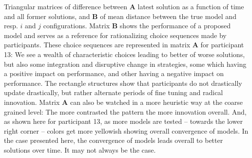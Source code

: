 \label{fig:matrices}
Triangular matrices of difference between {\bf A} latest solution as a function of time and all former solutions, and {\bf B} of mean distance between the true model and resp. $i$ and $j$ configurations. Matrix {\bf B} shows the performance of a proposed model and serves as a reference for rationalizing choice sequences made by participants. These choice sequences are represented in matrix {\bf A} for participant 13: We see a wealth of characteristic choices leading to better of worse solutions, but also some integration and disruptive change in strategies, some which having a positive impact on performance, and other having a negative impact on performance. The rectangle structures show that participants do not drastically update drastically, but rather alternate periods of fine tuning and radical innovation. Matrix {\bf A} can also be watched in a more heuristic way at the coarse grained level: The more contrasted the pattern the more innovation overall. And, as shown here for participant 13, as more models are tested -- towards the lower right corner -- colors get more yellowish showing overall convergence of models. In the case presented here, the convergence of models leads overall to better solutions over time. It may not always be the case.
  
  
  
  